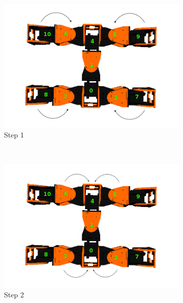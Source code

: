 \begin{figure}[h]
		\centering
        \begin{subfigure}[b]{0.4\textwidth}
                \centering
                \includegraphics[width=\textwidth]{images/Hormone_protocol_11_2_step1.png}
                \caption{Step 1}
                \label{fig:11_2_step1}
        \end{subfigure}
        ~
        \begin{subfigure}[b]{0.4\textwidth}
                \centering
                \includegraphics[width=\textwidth]{images/Hormone_protocol_11_2_step2.png}
                \caption{Step 2}
                \label{fig:11_2_step2}
        \end{subfigure}
        ~
        \begin{subfigure}[b]{0.4\textwidth}

\end{subfigure}
\end{figure}
